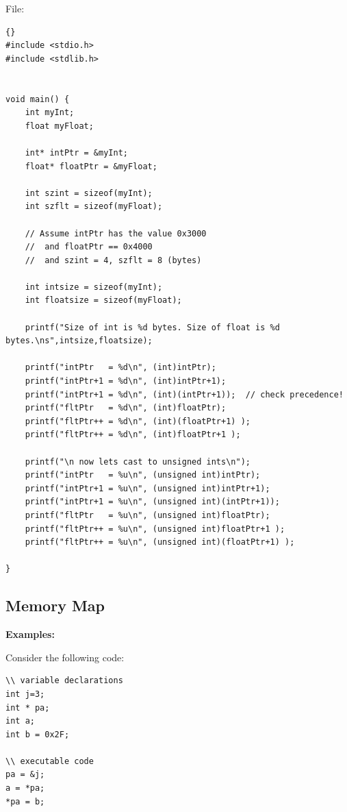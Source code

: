 



File: 


\lstset{language=c}
\lstset{basicstyle=\ttfamily, commentstyle=\textit}
\begin{lstlisting}[frame=trbl]{} 
#include <stdio.h>
#include <stdlib.h>


void main() {
    int myInt;
    float myFloat;

    int* intPtr = &myInt;
    float* floatPtr = &myFloat;

    int szint = sizeof(myInt);
    int szflt = sizeof(myFloat);

    // Assume intPtr has the value 0x3000
    //  and floatPtr == 0x4000
    //  and szint = 4, szflt = 8 (bytes)
    
    int intsize = sizeof(myInt);
    int floatsize = sizeof(myFloat);
    
    printf("Size of int is %d bytes. Size of float is %d bytes.\ns",intsize,floatsize);

    printf("intPtr   = %d\n", (int)intPtr);
    printf("intPtr+1 = %d\n", (int)intPtr+1);
    printf("intPtr+1 = %d\n", (int)(intPtr+1));  // check precedence!
    printf("fltPtr   = %d\n", (int)floatPtr);
    printf("fltPtr++ = %d\n", (int)(floatPtr+1) );
    printf("fltPtr++ = %d\n", (int)floatPtr+1 );
    
    printf("\n now lets cast to unsigned ints\n");
    printf("intPtr   = %u\n", (unsigned int)intPtr);
    printf("intPtr+1 = %u\n", (unsigned int)intPtr+1);
    printf("intPtr+1 = %u\n", (unsigned int)(intPtr+1));
    printf("fltPtr   = %u\n", (unsigned int)floatPtr);
    printf("fltPtr++ = %u\n", (unsigned int)floatPtr+1 );
    printf("fltPtr++ = %u\n", (unsigned int)(floatPtr+1) );

}
\end{lstlisting}

\subsection{Memory Map}
\noindent
{\bf Examples: }

Consider the following code:
\begin{verbatim}
\\ variable declarations
int j=3;
int * pa;
int a;
int b = 0x2F;

\\ executable code
pa = &j;
a = *pa;
*pa = b;
\end{verbatim}

